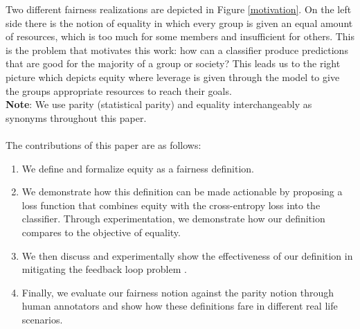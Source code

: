 Two different fairness realizations are depicted in Figure \ref{motivation}. On the left side there is the notion of equality in which every group is given an equal amount of resources, which is too much for some members and insufficient for others. This is the problem that motivates this work: how can a classifier produce predictions that are good for the majority of a group or society? This leads us to the right picture which depicts equity where leverage is given through the model to give the groups appropriate resources to reach their goals. \\
\textbf{Note}: We use parity (statistical parity) and equality interchangeably as synonyms throughout this paper. \\ \\
The contributions of this paper are as follows:
\begin{enumerate}
    \item We define and formalize equity as a fairness definition.
    \item We demonstrate how this definition can be made actionable by proposing a loss function that combines equity with the cross-entropy loss into the classifier.
    Through experimentation, we demonstrate how our definition compares to the objective of equality.
    \item We then discuss and experimentally show the effectiveness of our definition in mitigating the feedback loop problem \cite{chouldechova2018frontiers}.
    \item Finally, we evaluate our fairness notion against the parity notion through human annotators and show how these definitions fare in different real life scenarios.
\end{enumerate}
